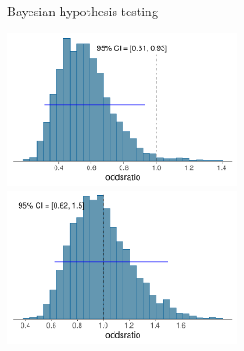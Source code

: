 \documentclass[english,t]{beamer}
\begin{document}
\begin{frame}{Bayesian hypothesis testing}
{\begin{minipage}{14.1cm}
      \hspace{-1.2cm}\includegraphics[width=6.8cm]{odds1_ci.pdf}\includegraphics[width=6.8cm]{odds2_ci.pdf}
    \end{minipage}}
  
\end{frame}
\end{document}
